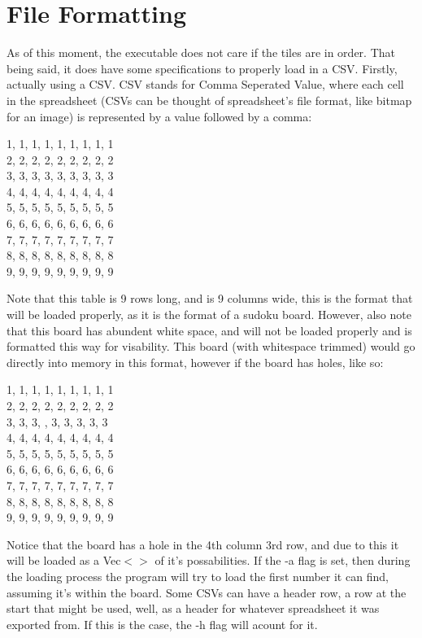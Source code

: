 \documentclass[11pt]{article}
\begin{document}
\section{File Formatting}
As of this moment, the executable does not care if the tiles are in order. That being said, it does have some specifications to properly load in a CSV. Firstly, actually using a CSV.
CSV stands for Comma Seperated Value, where each cell in the spreadsheet (CSVs can be thought of spreadsheet's file format, like bitmap for an image) is represented by a value followed by a comma:\\
\begin{center}
  1, 1, 1, 1, 1, 1, 1, 1, 1\\
  2, 2, 2, 2, 2, 2, 2, 2, 2\\
  3, 3, 3, 3, 3, 3, 3, 3, 3\\
  4, 4, 4, 4, 4, 4, 4, 4, 4\\
  5, 5, 5, 5, 5, 5, 5, 5, 5\\
  6, 6, 6, 6, 6, 6, 6, 6, 6\\
  7, 7, 7, 7, 7, 7, 7, 7, 7\\
  8, 8, 8, 8, 8, 8, 8, 8, 8\\
  9, 9, 9, 9, 9, 9, 9, 9, 9\\
\end{center}
Note that this table is 9 rows long, and is 9 columns wide, this is the format that will be loaded properly, as it is the format of a sudoku board. However, also note that this board has 
abundent white space, and will not be loaded properly and is formatted this way for visability. This board (with whitespace trimmed) would go directly into memory in this format, however if the board has holes, like so:\\
\begin{center}
  1, 1, 1, 1, 1, 1, 1, 1, 1\\
  2, 2, 2, 2, 2, 2, 2, 2, 2\\
  3, 3, 3,  , 3, 3, 3, 3, 3\\
  4, 4, 4, 4, 4, 4, 4, 4, 4\\
  5, 5, 5, 5, 5, 5, 5, 5, 5\\
  6, 6, 6, 6, 6, 6, 6, 6, 6\\
  7, 7, 7, 7, 7, 7, 7, 7, 7\\
  8, 8, 8, 8, 8, 8, 8, 8, 8\\
  9, 9, 9, 9, 9, 9, 9, 9, 9\\
\end{center}
Notice that the board has a hole in the 4th column 3rd row, and due to this it will be loaded as a Vec$<>$ of it's possabilities. If the -a flag is set, then 
during the loading process the program will try to load the first number it can find, assuming it's within the board. Some CSVs can have a header row, a row at the start that might 
be used, well, as a header for whatever spreadsheet it was exported from. If this is the case, the -h flag will acount for it. 
\end{document}
